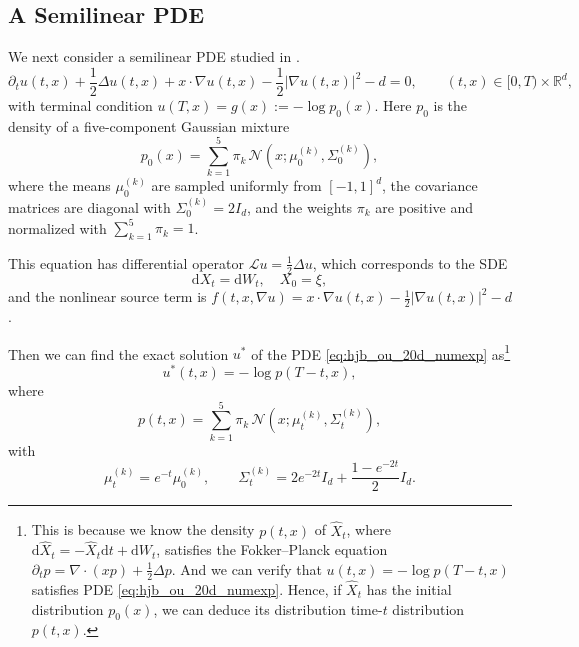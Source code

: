 \documentclass[twoside,11pt]{article}
\newcommand{\dd}{\mathrm{d}}
\newcommand{\1}{\mathbf{1}}
\numberwithin{equation}{section}
\begin{document}
\subsection{A Semilinear PDE}
\label{sec:numexp:hjb_ou_20d}

We next consider a semilinear PDE studied in \cite{han26}.
\begin{equation}
    \partial_t u(t,x)
    + \frac{1}{2}\Delta u(t,x)
    + x\cdot \nabla u(t,x)
    - \frac{1}{2}|\nabla u(t,x)|^2
    - d = 0,
    \qquad (t,x)\in [0,T)\times \mathbb{R}^d,
\label{eq:hjb_ou_20d_numexp}
\end{equation}
with terminal condition $
    u(T,x) = g(x) := -\log p_0(x)$. Here $p_0$ is the density of a five-component Gaussian mixture
\begin{equation}\label{eq:gmm_terminal_numexp}
    p_0(x) = \sum_{k=1}^{5}\pi_k\,\mathcal{N}(x;\mu_0^{(k)},\Sigma_0^{(k)}),
\end{equation}
where the means $\mu_0^{(k)}$ are sampled uniformly from $[-1,1]^d$, the covariance matrices are diagonal with $\Sigma_0^{(k)} = 2I_d$, and the weights $\pi_k$ are positive and normalized with $\sum_{k=1}^5 \pi_k=1$.


This equation has differential operator $\mathcal L u = \frac{1}{2}\Delta u$, which corresponds to the SDE
\begin{equation}\label{eq:sde for hjb}
    \dd X_t =    \dd W_t, \quad X_0 = \xi,
\end{equation}
and the nonlinear source term is $f(t,x,\nabla u) = x\cdot \nabla u(t,x) -\frac{1}{2}|\nabla u(t,x) |^2 - d$.



Then we can find the exact solution $ u^*$ of the PDE \eqref{eq:hjb_ou_20d_numexp} as\footnote{This is because we know the density $p(t,x)$ of $\hat X_t$, where $ \dd \hat X_t = -\hat X_t \dd t + \dd W_t$,  satisfies the Fokker--Planck equation $\partial_t p = \nabla\cdot(xp) + \frac{1}{2}\Delta p$. And we can verify that $ u(t,x) = -\log p(T- t,x)$ satisfies PDE \eqref{eq:hjb_ou_20d_numexp}. Hence, if $ \hat X_t$ has the initial distribution $p_0(x)$, we can deduce its distribution time-$t$ distribution $p(t,x)$.}
\begin{equation}
    u^\ast(t,x) = -\log p(T-t,x),
\label{eq:exact_solution_numexp}
\end{equation}
where
\begin{equation}\label{eq:gmm_time_evolved_numexp}
    p(t,x) = \sum_{k=1}^{5}\pi_k\,\mathcal{N}(x;\mu_{t}^{(k)},\Sigma_{t}^{(k)}),
\end{equation}
with
\begin{equation}
    \mu_{t}^{(k)} = e^{-t}\mu_0^{(k)},
    \qquad
    \Sigma_{t}^{(k)} = 2e^{-2t}I_d + \frac{1-e^{-2t}}{2}I_d. \label{eq:gmm_time_evolved_moments_numexp}
\end{equation}
\end{document}
